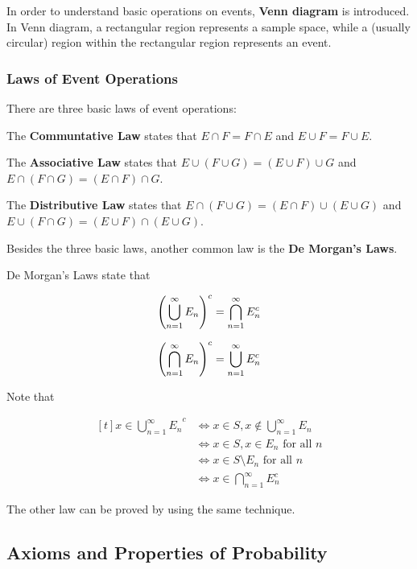 \documentclass[a4paper,12pt]{article}
\begin{document}
In order to understand basic operations on events, \textbf{Venn diagram} is introduced. In Venn diagram, a rectangular region represents a sample space, while a (usually circular) region within the rectangular region represents an event.

\subsubsection{Laws of Event Operations}
There are three basic laws of event operations:\n

\begin{pst}
  The \textbf{Communtative Law} states that $E\cap F=F\cap E$ and $E\cup F=F\cup E$.
\end{pst}\n

\begin{pst}
  The \textbf{Associative Law} states that $E\cup(F\cup G)=(E\cup F)\cup G$ and $E\cap(F\cap G)=(E\cap F)\cap G$.
\end{pst}\n

\begin{pst}
  The \textbf{Distributive Law} states that $E\cap(F\cup G)=(E\cap F)\cup(E\cup G)$ and $E\cup(F\cap G)=(E\cup F)\cap(E\cup G)$.
\end{pst}\n

Besides the three basic laws, another common law is the \textbf{De Morgan's Laws}.\n

\begin{thm}
  De Morgan's Laws state that

  $$\left( \bigcup_{n=1}^{\infty}E_{n}\right)^{c}=\bigcap_{n=1}^{\infty}E_{n}^{c}$$\s

  $$\left( \bigcap_{n=1}^{\infty}E_{n}\right)^{c}=\bigcup_{n=1}^{\infty}E_{n}^{c}$$\s

  \prf Note that

  $$\begin{aligned}[t]
    x\in{\bigcup_{n=1}^{\infty}E_{n}}^{c}&\Leftrightarrow x\in S,x\not\in\bigcup_{n=1}^{\infty}E_{n}\\
    &\Leftrightarrow x\in S, x\in E_{n}\text{ for all }n\\
    &\Leftrightarrow x\in S\setminus E_{n}\text{ for all }n\\
    &\Leftrightarrow x\in \bigcap_{n=1}^{\infty}E_{n}^{c}
  \end{aligned}$$\s

  The other law can be proved by using the same technique.
\end{thm}

\subsection{Axioms and Properties of Probability}
\end{document}
